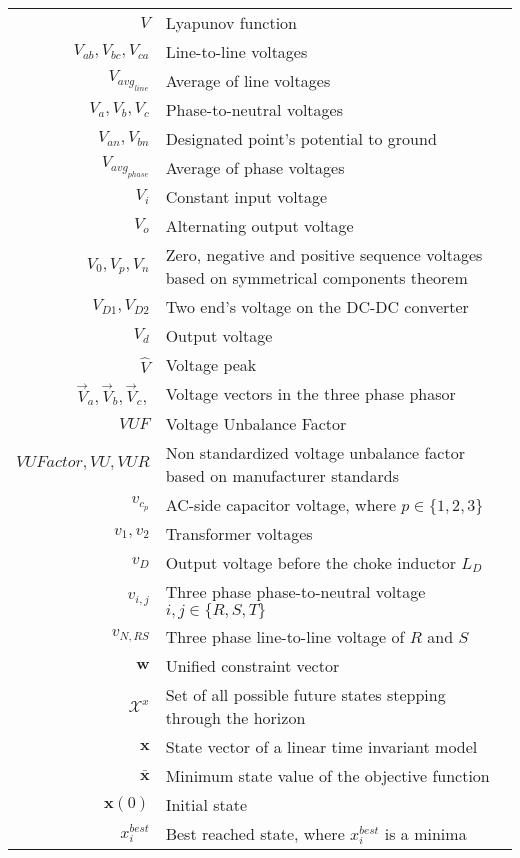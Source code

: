 \begin{scriptsize}
\begin{tabularx}{\textwidth}{r|X}
$V$                         & Lyapunov function\\
$V_{ab},V_{bc},V_{ca}$  					& Line-to-line voltages\\
$V_{avg_{line}}$  								& Average of line voltages\\	
$V_{a},V_{b},V_{c}$  							& Phase-to-neutral voltages\\
$V_{an},V_{bn}$  									& Designated point's potential to ground \\
$V_{avg_{phase}}$  								& Average of phase voltages\\
$V_i$															& Constant input voltage\\
$V_o$															& Alternating output voltage\\
$V_{0},V_{p},V_{n}$  							& Zero, negative and positive sequence voltages based on symmetrical components theorem\\
$V_{D1},V_{D2}$ 									& Two end's voltage on the DC-DC converter\\
$V_d$															& Output voltage\\
$\hat{V}$															& Voltage peak\\
$\vec{V}_a, \vec{V}_b, \vec{V}_c,$										& Voltage vectors in the three phase phasor\\
$VUF$  														& Voltage Unbalance Factor\\
$VUFactor,VU,VUR$                	& Non standardized voltage unbalance factor based on manufacturer standards\\
$v_{c_p}$													& AC-side capacitor voltage, where $p\in\{1,2,3\}$\\
$v_1,v_2$                         & Transformer voltages\\
$v_D$															& Output voltage before the choke inductor $L_D$\\
$v_{i,j}$													& Three phase phase-to-neutral voltage $i,j\in\{R,S,T\}$\\
$v_{N,RS}$												& Three phase line-to-line voltage of $R$ and $S$\\

$\textbf{w}$                & Unified constraint vector \\

$\mathcal{X}^x$             & Set of all possible future states stepping through the horizon\\
$\textbf{x}$											& State vector of a linear time invariant model\\
$\bar{\textbf{x}}$											& Minimum state value of the objective function\\
$\textbf{x}(0)$                 & Initial state\\
$x_i^{best}$											& Best reached state, where $x_i^{best}$ is a minima\\


\end{tabularx}
\end{scriptsize}
